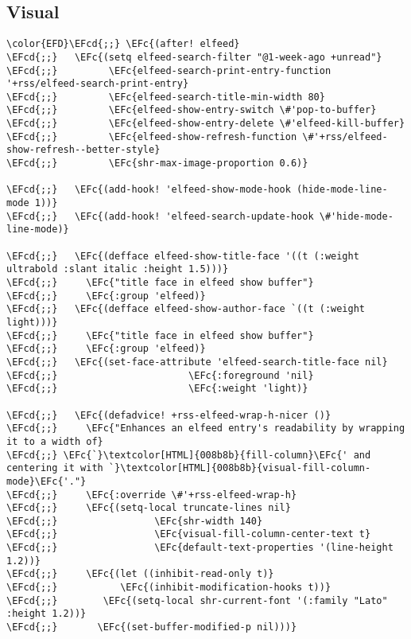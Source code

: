 \documentclass[12pt]{article}
\theoremstyle{plain}%
\theoremstyle{definition}
\theoremstyle{remark}
\newcommand{\EFc}[1]{\textcolor{EFc}{#1}} %
\newcommand{\EFcd}[1]{\textcolor{EFcd}{#1}} %
\begin{document}
\subsection{Visual}
\label{sec:org032a226}
\begin{Code}
\begin{Verbatim}
\color{EFD}\EFcd{;;} \EFc{(after! elfeed}
\EFcd{;;}   \EFc{(setq elfeed-search-filter "@1-week-ago +unread"}
\EFcd{;;}         \EFc{elfeed-search-print-entry-function '+rss/elfeed-search-print-entry}
\EFcd{;;}         \EFc{elfeed-search-title-min-width 80}
\EFcd{;;}         \EFc{elfeed-show-entry-switch \#'pop-to-buffer}
\EFcd{;;}         \EFc{elfeed-show-entry-delete \#'elfeed-kill-buffer}
\EFcd{;;}         \EFc{elfeed-show-refresh-function \#'+rss/elfeed-show-refresh--better-style}
\EFcd{;;}         \EFc{shr-max-image-proportion 0.6)}

\EFcd{;;}   \EFc{(add-hook! 'elfeed-show-mode-hook (hide-mode-line-mode 1))}
\EFcd{;;}   \EFc{(add-hook! 'elfeed-search-update-hook \#'hide-mode-line-mode)}

\EFcd{;;}   \EFc{(defface elfeed-show-title-face '((t (:weight ultrabold :slant italic :height 1.5)))}
\EFcd{;;}     \EFc{"title face in elfeed show buffer"}
\EFcd{;;}     \EFc{:group 'elfeed)}
\EFcd{;;}   \EFc{(defface elfeed-show-author-face `((t (:weight light)))}
\EFcd{;;}     \EFc{"title face in elfeed show buffer"}
\EFcd{;;}     \EFc{:group 'elfeed)}
\EFcd{;;}   \EFc{(set-face-attribute 'elfeed-search-title-face nil}
\EFcd{;;}                       \EFc{:foreground 'nil}
\EFcd{;;}                       \EFc{:weight 'light)}

\EFcd{;;}   \EFc{(defadvice! +rss-elfeed-wrap-h-nicer ()}
\EFcd{;;}     \EFc{"Enhances an elfeed entry's readability by wrapping it to a width of}
\EFcd{;;} \EFc{`}\textcolor[HTML]{008b8b}{fill-column}\EFc{' and centering it with `}\textcolor[HTML]{008b8b}{visual-fill-column-mode}\EFc{'."}
\EFcd{;;}     \EFc{:override \#'+rss-elfeed-wrap-h}
\EFcd{;;}     \EFc{(setq-local truncate-lines nil}
\EFcd{;;}                 \EFc{shr-width 140}
\EFcd{;;}                 \EFc{visual-fill-column-center-text t}
\EFcd{;;}                 \EFc{default-text-properties '(line-height 1.2))}
\EFcd{;;}     \EFc{(let ((inhibit-read-only t)}
\EFcd{;;}           \EFc{(inhibit-modification-hooks t))}
\EFcd{;;}        \EFc{(setq-local shr-current-font '(:family "Lato" :height 1.2))}
\EFcd{;;}       \EFc{(set-buffer-modified-p nil)))}


\end{Verbatim}
\end{Code}
\end{document}
